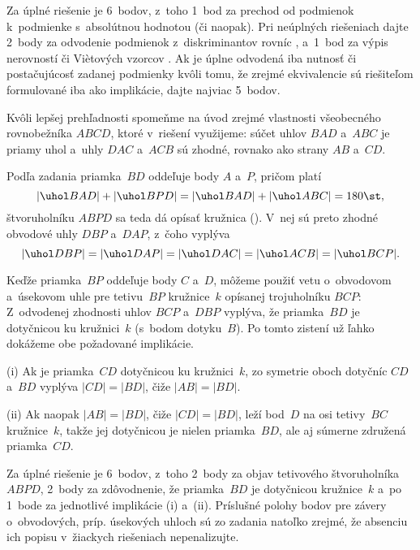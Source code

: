 {\nobreak\medskip\petit\noindent
Za úplné riešenie je 6~bodov, z~toho 1~bod
za prechod od podmienok  k~podmienke s~absolútnou hodnotou (či
naopak). Pri neúplných riešeniach dajte 2~body za odvodenie podmienok
 z~diskriminantov rovníc ,  a~1~bod za výpis
nerovností  či Vi\`etových vzorcov . Ak je úplne odvodená iba
nutnosť či postačujúcosť zadanej podmienky kvôli tomu, že zrejmé
ekvivalencie sú riešiteľom formulované
iba ako implikácie, dajte najviac 5~bodov.
\endpetit
\bigbreak
}

{%
Kvôli lepšej prehľadnosti spomeňme na úvod zrejmé vlastnosti všeobecného
rovnobežníka $ABCD$, ktoré v~riešení využijeme: súčet
uhlov $BAD$ a~$ABC$ je priamy uhol a~uhly $DAC$ a~$ACB$ sú zhodné, rovnako ako strany $AB$ a~$CD$.

Podľa zadania priamka~$BD$ oddeľuje body $A$ a~$P$,
pričom platí
$$
|\uhol BAD|+|\uhol BPD|=|\uhol BAD|+|\uhol ABC|=180\st,
$$
štvoruholníku $ABPD$ sa teda dá opísať kružnica (\obr).
V~nej sú preto zhodné obvodové uhly $DBP$ a~$DAP$, z~čoho vyplýva
$$
|\uhol DBP|=|\uhol DAP|=|\uhol DAC|=|\uhol ACB|=|\uhol BCP|.
$$

Keďže priamka~$BP$ oddeľuje body $C$ a~$D$, môžeme použiť vetu
o~obvodovom a~úsekovom uhle pre tetivu~$BP$ kružnice~$k$ opísanej trojuholníku $BCP$: Z~odvodenej zhodnosti
uhlov $BCP$ a~$DBP$ vyplýva, že priamka~$BD$ je dotyčnicou ku kružnici~$k$ (s~bodom dotyku~$B$).
Po tomto zistení už ľahko dokážeme obe požadované implikácie.

(i) Ak je priamka~$CD$ dotyčnicou ku kružnici~$k$, zo symetrie oboch dotyčníc
$CD$ a~$BD$ vyplýva $|CD|=|BD|$, čiže $|AB|=|BD|$.

(ii) Ak naopak $|AB|=|BD|$, čiže $|CD|=|BD|$, leží bod~$D$
na osi tetivy~$BC$ kružnice~$k$, takže jej dotyčnicou je nielen
priamka~$BD$, ale aj súmerne združená priamka~$CD$.


\nobreak\medskip\petit\noindent
Za úplné riešenie je 6~bodov, z~toho 2~body za objav tetivového štvoruholníka $ABPD$, 2~body za
zdôvodnenie, že priamka~$BD$ je dotyčnicou kružnice~$k$ a~po 1~bode za
jednotlivé implikácie (i) a~(ii). Príslušné polohy bodov pre závery
o~obvodových, príp. úsekových uhloch sú zo zadania
natoľko zrejmé, že absenciu ich popisu v~žiackych
riešeniach nepenalizujte.
\endpetit
\bigbreak
}

